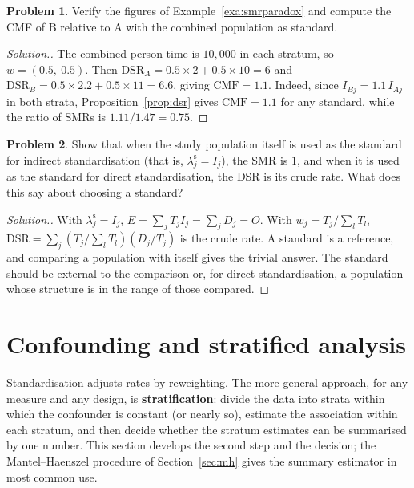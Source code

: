 \documentclass[11pt,a4paper]{article}
\numberwithin{equation}{section}
\theoremstyle{definition}
\newtheorem{problemx}{Problem}[subsection]
\newenvironment{problem}{\begin{problemx}}{\end{problemx}}
\newenvironment{solution}
  {\renewcommand{\qedsymbol}{}\begin{proof}[\textit{Solution}.]}
  {\end{proof}}
\begin{document}
\begin{problem}
Verify the figures of Example~\ref{exa:smrparadox} and compute the CMF of B relative to A with the combined population as standard.
\end{problem}

\begin{solution}
The combined person-time is $10{,}000$ in each stratum, so $w = (0.5,\ 0.5)$. Then $\text{DSR}_A = 0.5 \times 2 + 0.5 \times 10 = 6$ and $\text{DSR}_B = 0.5 \times 2.2 + 0.5 \times 11 = 6.6$,
giving $\text{CMF} = 1.1$. Indeed, since $I_{Bj} = 1.1\,I_{Aj}$ in both strata, Proposition~\ref{prop:dsr} gives $\text{CMF} = 1.1$ for any standard, while the ratio of
SMRs is $1.11/1.47 = 0.75$.
\end{solution}

\begin{problem}
Show that when the study population itself is used as the standard for indirect standardisation (that is, $\lambda^{\text{s}}_j = I_j$), the SMR is $1$,
and when it is used as the standard for direct standardisation, the DSR is its crude rate. What does this say about choosing a standard?
\end{problem}

\begin{solution}
With $\lambda^{\text{s}}_j = I_j$, $E = \sum_j T_j I_j = \sum_j D_j = O$. With $w_j = T_j/\sum_l T_l$, $\text{DSR} = \sum_j (T_j/\sum_l T_l)(D_j/T_j)$ is the crude rate. A standard
is a reference, and comparing a population with itself gives the trivial answer. The standard should be external to the comparison or,
for direct standardisation, a population whose structure is in the range of those compared.
\end{solution}

\section{Confounding and stratified analysis}
\label{sec:stratified}

Standardisation adjusts rates by reweighting. The more general approach, for any measure and any design, is \textbf{stratification}: divide
the data into strata within which the confounder is constant (or nearly so), estimate the association within each stratum, and then
decide whether the stratum estimates can be summarised by one number. This section develops the second step and the decision; the
Mantel--Haenszel procedure of Section~\ref{sec:mh} gives the summary estimator in most common use.
\end{document}
